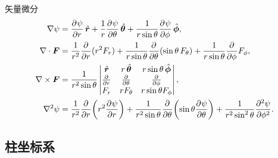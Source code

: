 矢量微分
\begin{align}
    \grad\psi &= \pv\psi r\uvec r + \frac1r\pv\psi \theta\uvec\theta + \frac1{r\sin\theta}\pv\psi \phi\uvec\phi,\\
    \div\bm F &= \frac1{r^2}\pp r(r^2F_r) + \frac1{r\sin\theta}\pp\theta(\sin\theta\,F_\theta) + \frac1{r\sin\theta}\pp\phi F_\phi,\\
    \curl\bm F &= \frac1{r^2\sin\theta}
    \begin{vmatrix}
        \uvec r&r\uvec\theta&r\sin\theta\uvec\phi\\
        \pp r&\pp\theta&\pp\phi\\
        F_r&rF_\theta&r\sin\theta F_\phi
    \end{vmatrix},\\
    \laplacian\psi &= \frac1{r^2}\pp r\biggp{r^2\pv\psi r} + \frac1{r^2\sin\theta}\pp\theta\biggp{\sin\theta\pv\psi\theta} + \frac1{r^2\sin^2\theta}\pv[2]\psi\phi.
\end{align}

\subsection{柱坐标系}
\label{ssec:cylindrical coordinate}

